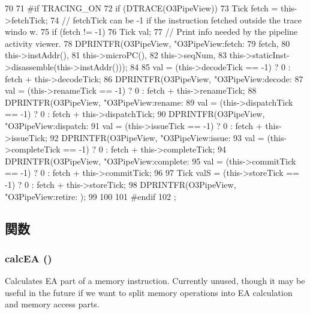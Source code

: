 \begin{DoxyCode}
70 {
71 #if TRACING_ON
72     if (DTRACE(O3PipeView)) {
73         Tick fetch = this->fetchTick;
74         // fetchTick can be -1 if the instruction fetched outside the trace windo
      w.
75         if (fetch != -1) {
76             Tick val;
77             // Print info needed by the pipeline activity viewer.
78             DPRINTFR(O3PipeView, "O3PipeView:fetch:%
79                      fetch,
80                      this->instAddr(),
81                      this->microPC(),
82                      this->seqNum,
83                      this->staticInst->disassemble(this->instAddr()));
84 
85             val = (this->decodeTick == -1) ? 0 : fetch + this->decodeTick;
86             DPRINTFR(O3PipeView, "O3PipeView:decode:%
87             val = (this->renameTick == -1) ? 0 : fetch + this->renameTick;
88             DPRINTFR(O3PipeView, "O3PipeView:rename:%
89             val = (this->dispatchTick == -1) ? 0 : fetch + this->dispatchTick;
90             DPRINTFR(O3PipeView, "O3PipeView:dispatch:%
91             val = (this->issueTick == -1) ? 0 : fetch + this->issueTick;
92             DPRINTFR(O3PipeView, "O3PipeView:issue:%
93             val = (this->completeTick == -1) ? 0 : fetch + this->completeTick;
94             DPRINTFR(O3PipeView, "O3PipeView:complete:%
95             val = (this->commitTick == -1) ? 0 : fetch + this->commitTick;
96 
97             Tick valS = (this->storeTick == -1) ? 0 : fetch + this->storeTick;
98             DPRINTFR(O3PipeView, "O3PipeView:retire:%
      );
99         }
100     }
101 #endif
102 };
\end{DoxyCode}


\subsection{関数}
\hypertarget{classBaseO3DynInst_a1a338741bddb2eb956bda5a4188949cf}{
\subsubsection[{calcEA}]{ calcEA ()}}
\label{classBaseO3DynInst_a1a338741bddb2eb956bda5a4188949cf}
Calculates EA part of a memory instruction. Currently unused, though it may be useful in the future if we want to split memory operations into EA calculation and memory access parts. 


